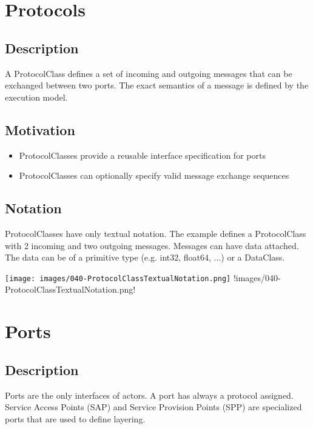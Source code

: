 \section{Protocols}

\subsection{Description}

A ProtocolClass defines a set of incoming and outgoing messages that can be exchanged between two ports.
The exact semantics of a message is defined by the execution model.

\subsection{Motivation}

\begin{itemize}
\item ProtocolClasses provide a reusable interface specification for ports
\item ProtocolClasses can optionally specify valid message exchange sequences
\end{itemize}

\subsection{Notation}

ProtocolClasses have only textual notation. 
The example defines a ProtocolClass with 2 incoming and two outgoing messages. Messages can have data attached. The data can be of a primitive type (e.g. int32, float64, ...) or a DataClass.

\texttt{[image: images/040-ProtocolClassTextualNotation.png]}
!images/040-ProtocolClassTextualNotation.png!

\section{Ports}

\subsection{Description}

Ports are the only interfaces of actors. A port has always a protocol assigned. 
Service Access Points (SAP) and Service Provision Points (SPP) are specialized ports that are used to define layering.

